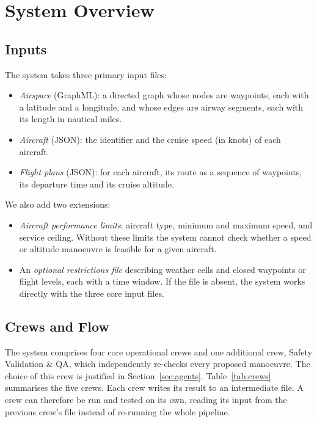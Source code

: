 \section{System Overview}\label{sec:overview}

\subsection{Inputs}\label{sec:inputs}
The system takes three primary input files:
\begin{itemize}
    \item \emph{Airspace} (GraphML): a directed graph whose nodes are waypoints, each with a latitude and a longitude, and whose edges are airway segments, each with its length in nautical miles.
    \item \emph{Aircraft} (JSON): the identifier and the cruise speed (in knots) of each aircraft.
    \item \emph{Flight plans} (JSON): for each aircraft, its route as a sequence of waypoints, its departure time and its cruise altitude.
\end{itemize}
We also add two extensions:
\begin{itemize}
    \item \emph{Aircraft performance limits}: aircraft type, minimum and maximum speed, and service ceiling. Without these limits the system cannot check whether a speed or altitude manoeuvre is feasible for a given aircraft.
    \item An \emph{optional restrictions file} describing weather cells and closed waypoints or flight levels, each with a time window. If the file is absent, the system works directly with the three core input files.
\end{itemize}

\subsection{Crews and Flow}\label{sec:flow}
The system comprises four core operational crews and one additional crew, Safety Validation \& QA, which independently re-checks every proposed manoeuvre. The choice of this crew is justified in Section~\ref{sec:agents}. Table~\ref{tab:crews} summarises the five crews. Each crew writes its result to an intermediate file. A crew can therefore be run and tested on its own, reading its input from the previous crew's file instead of re-running the whole pipeline.

